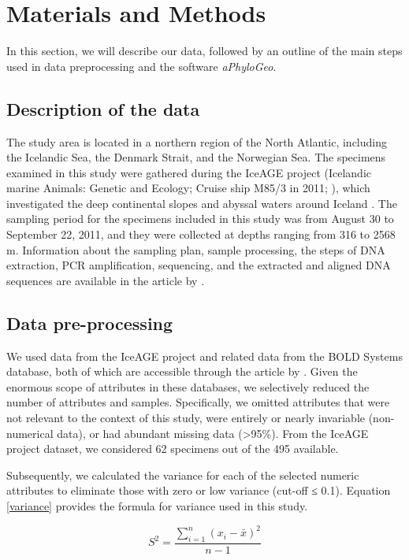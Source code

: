 \section{Materials and Methods}\label{materials-methods}
In this section, we will describe our data, followed by an outline of the main steps used in data preprocessing and the software \textit{aPhyloGeo}. 

\subsection{Description of the data}
The study area is located in a northern region of the North Atlantic, including the Icelandic Sea, the Denmark Strait, and the Norwegian Sea. The specimens examined in this study were gathered during the IceAGE project (Icelandic marine Animals: Genetic and Ecology; Cruise ship M85/3 in 2011; \cite{brix_iceage_2014}), which investigated the deep continental slopes and abyssal waters around Iceland \citep{meisner_prefacebiodiversity_2018}. The sampling period for the specimens included in this study was from August 30 to September 22, 2011, and they were collected at depths ranging from 316 to 2568 m.  Information about the sampling plan, sample processing, the steps of DNA extraction, PCR amplification, sequencing, and the extracted and aligned DNA sequences are available in the article by \citep{uhlir_adding_2021}.

\subsection{Data pre-processing}
We used data from the IceAGE project and related data from the BOLD Systems database, both of which are accessible through the article by \citep{uhlir_adding_2021}. Given the enormous scope of attributes in these databases, we selectively reduced the number of attributes and samples. Specifically, we omitted attributes that were not relevant to the context of this study, were entirely or nearly invariable (non-numerical data), or had abundant missing data (>95\%). From the IceAGE project dataset, we considered 62 specimens out of the 495 available.

Subsequently, we calculated the variance for each of the selected numeric attributes to eliminate those with zero or low variance (cut-off ≤ 0.1). Equation \ref{variance} provides the formula for variance used in this study.

\begin{equation}\label{variance}
    S^2 = \frac{\sum_{i=1}^{n} (x_i - \bar{x})^2}{n-1}
\end{equation}

